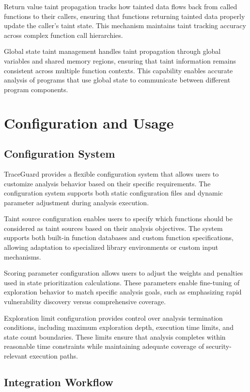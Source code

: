 Return value taint propagation tracks how tainted data flows back from called functions to their callers, ensuring that functions returning tainted data properly update the caller's taint state. This mechanism maintains taint tracking accuracy across complex function call hierarchies.

Global state taint management handles taint propagation through global variables and shared memory regions, ensuring that taint information remains consistent across multiple function contexts. This capability enables accurate analysis of programs that use global state to communicate between different program components.

\section{Configuration and Usage}\label{sec:configuration_and_usage}

\subsection{Configuration System}

TraceGuard provides a flexible configuration system that allows users to customize analysis behavior based on their specific requirements. The configuration system supports both static configuration files and dynamic parameter adjustment during analysis execution.

Taint source configuration enables users to specify which functions should be considered as taint sources based on their analysis objectives. The system supports both built-in function databases and custom function specifications, allowing adaptation to specialized library environments or custom input mechanisms.

Scoring parameter configuration allows users to adjust the weights and penalties used in state prioritization calculations. These parameters enable fine-tuning of exploration behavior to match specific analysis goals, such as emphasizing rapid vulnerability discovery versus comprehensive coverage.

Exploration limit configuration provides control over analysis termination conditions, including maximum exploration depth, execution time limits, and state count boundaries. These limits ensure that analysis completes within reasonable time constraints while maintaining adequate coverage of security-relevant execution paths.

\subsection{Integration Workflow}


